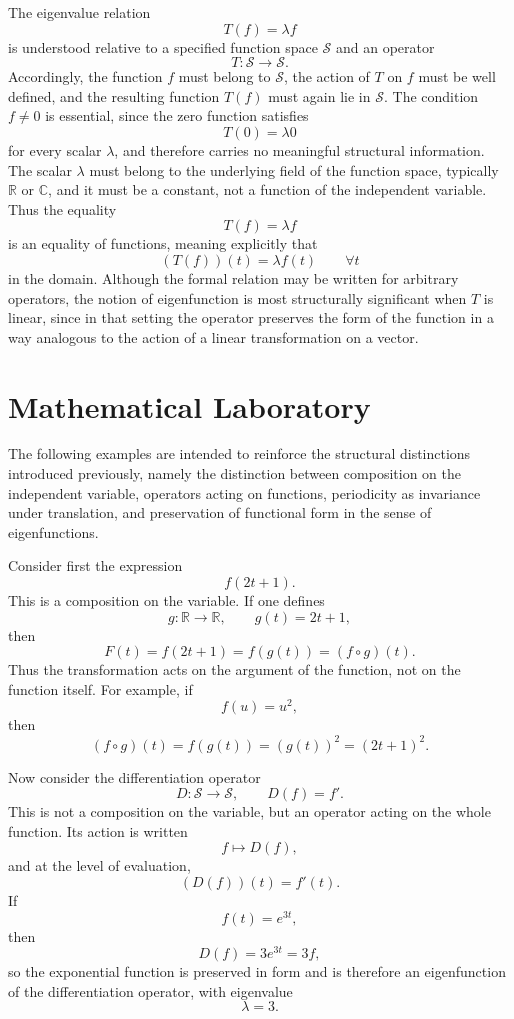 \documentclass{article}
\begin{document}
	The eigenvalue relation
	\[
	T(f)=\lambda f
	\]
	is understood relative to a specified function space \(\mathcal{S}\) and an operator
	\[
	T:\mathcal{S}\to\mathcal{S}.
	\]
	Accordingly, the function \(f\) must belong to \(\mathcal{S}\), the action of \(T\) on \(f\) must be well defined, and the resulting function \(T(f)\) must again lie in \(\mathcal{S}\). The condition \(f\neq 0\) is essential, since the zero function satisfies
	\[
	T(0)=\lambda 0
	\]
	for every scalar \(\lambda\), and therefore carries no meaningful structural information. The scalar \(\lambda\) must belong to the underlying field of the function space, typically \(\mathbb{R}\) or \(\mathbb{C}\), and it must be a constant, not a function of the independent variable. Thus the equality
	\[
	T(f)=\lambda f
	\]
	is an equality of functions, meaning explicitly that
	\[
	(T(f))(t)=\lambda f(t)\qquad \forall t
	\]
	in the domain. Although the formal relation may be written for arbitrary operators, the notion of eigenfunction is most structurally significant when \(T\) is linear, since in that setting the operator preserves the form of the function in a way analogous to the action of a linear transformation on a vector.
	
	\section*{Mathematical Laboratory}
	
	The following examples are intended to reinforce the structural distinctions introduced previously, namely the distinction between composition on the independent variable, operators acting on functions, periodicity as invariance under translation, and preservation of functional form in the sense of eigenfunctions.
	
	Consider first the expression
	\[
	f(2t+1).
	\]
	This is a composition on the variable. If one defines
	\[
	g:\mathbb{R}\to\mathbb{R},\qquad g(t)=2t+1,
	\]
	then
	\[
	F(t)=f(2t+1)=f(g(t))=(f\circ g)(t).
	\]
	Thus the transformation acts on the argument of the function, not on the function itself. For example, if
	\[
	f(u)=u^2,
	\]
	then
	\[
	(f\circ g)(t)=f(g(t))=(g(t))^2=(2t+1)^2.
	\]
	
	Now consider the differentiation operator
	\[
	D:\mathcal{S}\to\mathcal{S},\qquad D(f)=f'.
	\]
	This is not a composition on the variable, but an operator acting on the whole function. Its action is written
	\[
	f\longmapsto D(f),
	\]
	and at the level of evaluation,
	\[
	(D(f))(t)=f'(t).
	\]
	If
	\[
	f(t)=e^{3t},
	\]
	then
	\[
	D(f)=3e^{3t}=3f,
	\]
	so the exponential function is preserved in form and is therefore an eigenfunction of the differentiation operator, with eigenvalue
	\[
	\lambda=3.
	\]
	
\end{document}
